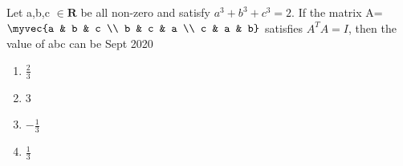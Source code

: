   \item Let a,b,c $\in \mathbf{R}$ be all non-zero and satisfy $a^3+b^3+c^3=2$. If the matrix A=$\myvec {a & b & c \\ b & c & a \\ c & a & b}$ satisfies $A^TA=I$, then the value of abc can be \hfill{Sept 2020}
   \begin{enumerate}
       \item $\frac{2}{3}$
       \item 3
       \item $-\frac{1}{3}$
       \item $\frac{1}{3}$
   \end{enumerate}

